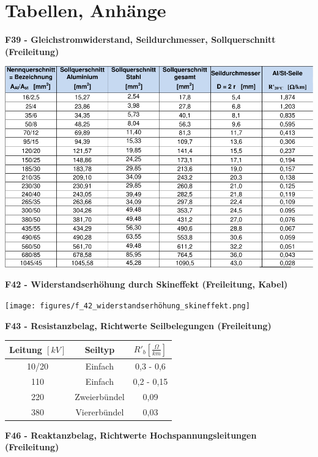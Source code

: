 \onecolumn
\section{Tabellen, Anhänge}
\large
\textbf{F39 - Gleichstromwiderstand, Seildurchmesser, Sollquerschnitt (Freileitung)}

\includegraphics[width=0.9\columnwidth]{figures/freileitung_f39_resistanzbelag.png}

\textbf{F42 - Widerstandserhöhung durch Skineffekt (Freileitung, Kabel)}

\texttt{[image: figures/f\_42\_widerstandserhöhung\_skineffekt.png]}

\newpage
\textbf{F43 - Resistanzbelag, Richtwerte Seilbelegungen (Freileitung)}

\begin{center}
\begin{tabular}[h]{|c|c|c|}
    \hline
    Leitung $[kV]$ & Seiltyp & $R'_b \left[ \frac{\Omega}{km} \right]$ \\
    \hline
    10/20 & Einfach& 0,3 - 0,6 \\
    \hline
    110 & Einfach& 0,2 - 0,15\\
    \hline
    220 & Zweierbündel& 0,09\\
    \hline
    380 & Viererbündel & 0,03\\
    \hline
\end{tabular}
\end{center}

\textbf{F46 - Reaktanzbelag, Richtwerte Hochspannungsleitungen (Freileitung)}

